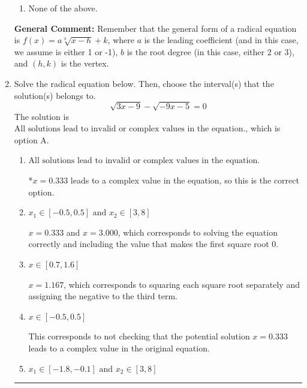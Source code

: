 \documentclass{extbook}[14pt]
\newcommand{\litem}[1]{\item #1

\rule{\textwidth}{0.4pt}}
\begin{document}
\begin{enumerate}
{\begin{enumerate}[label=\Alph*.]
\item None of the above.\end{enumerate}
\textbf{General Comment:} Remember that the general form of a radical equation is $ f(x) = a \sqrt[b]{x - h} + k $, where $a$ is the leading coefficient (and in this case, we assume is either 1 or -1), $b$ is the root degree (in this case, either 2 or 3), and $(h, k)$ is the vertex.
}
\litem{
Solve the radical equation below. Then, choose the interval(s) that the solution(s) belongs to.
\[ \sqrt{3 x - 9} - \sqrt{-9 x - 5} = 0 \]The solution is \( \text{All solutions lead to invalid or complex values in the equation.} \), which is option A.\begin{enumerate}[label=\Alph*.]
\item \( \text{All solutions lead to invalid or complex values in the equation.} \)

*$x = 0.333$ leads to a complex value in the equation, so this is the correct option.
\item \( x_1 \in [-0.5, 0.5] \text{ and } x_2 \in [3,8] \)

$x = 0.333$ and $x = 3.000$, which corresponds to solving the equation correctly and including the value that makes the first square root 0.
\item \( x \in [0.7,1.6] \)

$x = 1.167$, which corresponds to squaring each square root separately and assigning the negative to the third term.
\item \( x \in [-0.5,0.5] \)

This corresponds to not checking that the potential solution $x = 0.333$ leads to a complex value in the original equation.
\item \( x_1 \in [-1.8, -0.1] \text{ and } x_2 \in [3,8] \)


\end{enumerate}}
\end{enumerate}
\end{document}
